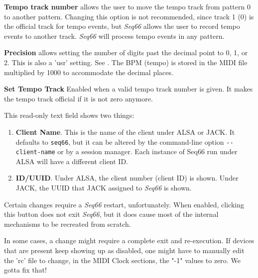    \textbf{Tempo track number}
   allows the user to move the tempo track from pattern 0 to
   another pattern.  Changing this option is not recommended, since track 1 (0)
   is the official track for tempo events, but \textsl{Seq66} allows the
   user to record tempo events to another track.  \textsl{Seq66} will
   process tempo events in any pattern.

   \textbf{Precision}
   allows setting the number of digits past the decimal point to 0, 1, or 2.
   This is also a 'usr' setting.
   See .
   The BPM (tempo) is stored in the MIDI file multiplied by 1000 to accommodate
   the decimal places.

   \textbf{Set Tempo Track}
   Enabled when a valid tempo track number is given.
   It makes the tempo track official if it is not zero anymore.

   This read-only text field shows two things:

   \begin{enumerate}
      \item \textbf{Client Name}.
         This is the name of the client under ALSA or JACK.  It defaults to
         \texttt{seq66}, but it can be altered by the command-line option
         \texttt{-{}-client-name} or by a session manager.
         Each instance of Seq66 run under ALSA will have a different client ID.
      \item \textbf{ID/UUID}.
         Under ALSA, the client number (client ID) is shown.
         Under JACK, the UUID that JACK assigned to \textsl{Seq66} is shown.
   \end{enumerate}

   Certain changes require a \textsl{Seq66} restart, unfortunately.
   When enabled, clicking this button does not exit \textsl{Seq66},
   but it does cause most of the internal mechanisms to be recreated
   from scratch.

   In some cases, a change might require a complete exit and re-execution.
   If devices that are present keep showing up as disabled, one
   might have to manually edit the 'rc' file to change, in the
   MIDI Clock sections, the "-1" values to zero.
   We gotta fix that!


